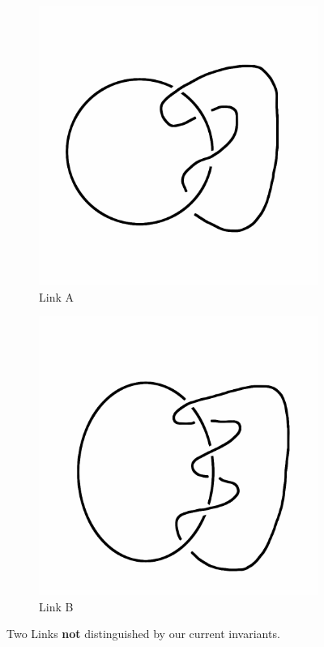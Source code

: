 \documentclass[12pt,letterpaper]{article}
\theoremstyle{definition}
\begin{document}
\begin{figure}[h]
    \centering
    \begin{subfigure}{.3\textwidth}
        \centering
        \includegraphics[width=\textwidth]{rgp11pics/lno2.png}
        \caption{Link A}
    \end{subfigure}
    \hspace{1cm}
    \begin{subfigure}{.3\textwidth}
        \centering         
        \includegraphics[width=\textwidth]{rgp11pics/lno3.png}
        \caption{Link B}
    \end{subfigure}
    \caption{Two Links \textbf{not} distinguished by our current invariants.}
\end{figure}
\end{document}
